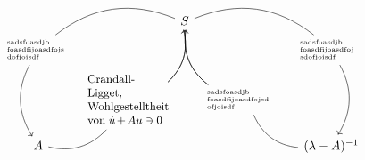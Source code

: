$$
\begin{tikzcd}[sep=tiny]
	& & S \arrow[drr, dash, bend left] \arrow[ddr, dash, bend right] \arrow[ddl, dash, bend left] \arrow[dll, dash, bend right]
	& & \\
	\parbox{50pt}{\tiny sadsfoasdjb\\foasdfijoasdfojs\\dofjoisdf} 
	\arrow[dd, bend right]
	& & & 
	& \parbox{50pt}{\tiny sadsfoasdjb\\foasdfijoasdfoj\\sdofjoisdf}
	\arrow[dd, bend left]	\\
	&\parbox{60pt}{\small Crandall-\\Ligget,\\Wohlgestelltheit\\ von $\dot{u}+Au\ni0$} 
	\arrow[uur, bend right]
	& 
	&\parbox{60pt}{\tiny sadsfoasdjb\\foasdfijoasdfojsd\\ofjoisdf}
	\arrow[uul, bend left]
	\\
	A \arrow[ur, dash, bend right] & & & & (\lambda - A)^{-1} \arrow[ul, dash, bend left]
\end{tikzcd}
$$
